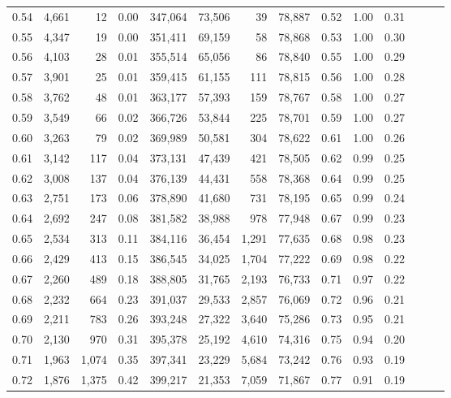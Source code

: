 \begin{tabular}{rrrrrrrrrrrrrr}
0.54 &  4,661 &     12 &  0.00 &  347,064 &   73,506 &      39 &  78,887 &  0.52 &  1.00 &      0.31 \\
0.55 &  4,347 &     19 &  0.00 &  351,411 &   69,159 &      58 &  78,868 &  0.53 &  1.00 &      0.30 \\
0.56 &  4,103 &     28 &  0.01 &  355,514 &   65,056 &      86 &  78,840 &  0.55 &  1.00 &      0.29 \\
0.57 &  3,901 &     25 &  0.01 &  359,415 &   61,155 &     111 &  78,815 &  0.56 &  1.00 &      0.28 \\
0.58 &  3,762 &     48 &  0.01 &  363,177 &   57,393 &     159 &  78,767 &  0.58 &  1.00 &      0.27 \\
0.59 &  3,549 &     66 &  0.02 &  366,726 &   53,844 &     225 &  78,701 &  0.59 &  1.00 &      0.27 \\
0.60 &  3,263 &     79 &  0.02 &  369,989 &   50,581 &     304 &  78,622 &  0.61 &  1.00 &      0.26 \\
0.61 &  3,142 &    117 &  0.04 &  373,131 &   47,439 &     421 &  78,505 &  0.62 &  0.99 &      0.25 \\
0.62 &  3,008 &    137 &  0.04 &  376,139 &   44,431 &     558 &  78,368 &  0.64 &  0.99 &      0.25 \\
0.63 &  2,751 &    173 &  0.06 &  378,890 &   41,680 &     731 &  78,195 &  0.65 &  0.99 &      0.24 \\
0.64 &  2,692 &    247 &  0.08 &  381,582 &   38,988 &     978 &  77,948 &  0.67 &  0.99 &      0.23 \\
0.65 &  2,534 &    313 &  0.11 &  384,116 &   36,454 &   1,291 &  77,635 &  0.68 &  0.98 &      0.23 \\
0.66 &  2,429 &    413 &  0.15 &  386,545 &   34,025 &   1,704 &  77,222 &  0.69 &  0.98 &      0.22 \\
0.67 &  2,260 &    489 &  0.18 &  388,805 &   31,765 &   2,193 &  76,733 &  0.71 &  0.97 &      0.22 \\
0.68 &  2,232 &    664 &  0.23 &  391,037 &   29,533 &   2,857 &  76,069 &  0.72 &  0.96 &      0.21 \\
0.69 &  2,211 &    783 &  0.26 &  393,248 &   27,322 &   3,640 &  75,286 &  0.73 &  0.95 &      0.21 \\
0.70 &  2,130 &    970 &  0.31 &  395,378 &   25,192 &   4,610 &  74,316 &  0.75 &  0.94 &      0.20 \\
0.71 &  1,963 &  1,074 &  0.35 &  397,341 &   23,229 &   5,684 &  73,242 &  0.76 &  0.93 &      0.19 \\
0.72 &  1,876 &  1,375 &  0.42 &  399,217 &   21,353 &   7,059 &  71,867 &  0.77 &  0.91 &      0.19 \\

\end{tabular}
